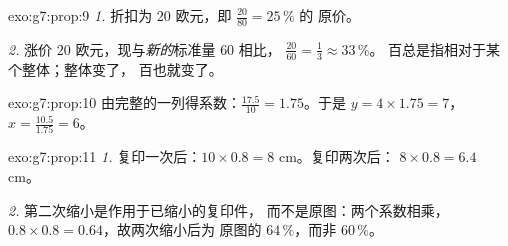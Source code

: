 \begin{solution}{exo:g7:prop:9}
\emph{1.} 折扣为 $20$ 欧元，即 $\frac{20}{80} = 25\,\%$ 的
原价。

\emph{2.} 涨价 $20$ 欧元，现与\emph{新的}标准量 $60$ 相比，
$\frac{20}{60} = \frac13 \approx 33\,\%$。
百总是指相对于某个整体；整体变了，
百也就变了。
\end{solution}

\begin{solution}{exo:g7:prop:10}
由完整的一列得系数：$\frac{17.5}{10} = 1.75$。于是
$y = 4 \times 1.75 = 7$，$x = \frac{10.5}{1.75} = 6$。
\end{solution}

\begin{solution}{exo:g7:prop:11}
\emph{1.} 复印一次后：$10 \times 0.8 = 8$ cm。复印两次后：
$8 \times 0.8 = 6.4$ cm。

\emph{2.} 第二次缩小是作用于已缩小的复印件，
而不是原图：两个系数相乘，
$0.8 \times 0.8 = 0.64$，故两次缩小后为
原图的 $64\,\%$，而非 $60\,\%$。
\end{solution}


